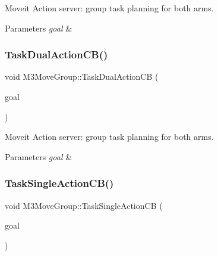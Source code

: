 Moveit Action server\+: group task planning for both arms. 


\begin{DoxyParams}{Parameters}
{\em goal} & \\
\hline
\end{DoxyParams}
\mbox{\label{classM3MoveGroup_a4999726d3def40e06217e81fb7f095ab}} 
\subsubsection{\texorpdfstring{Task\+Dual\+Action\+C\+B()}{TaskDualActionCB()}\hspace{0.1cm}{\footnotesize\ttfamily [2/2]}}
{\footnotesize\ttfamily void M3\+Move\+Group\+::\+Task\+Dual\+Action\+CB (\begin{DoxyParamCaption}\item[{const m3\+\_\+moveit\+::\+Moveit\+Dual\+Goal\+Const\+Ptr \&}]{goal }\end{DoxyParamCaption})\hspace{0.3cm}{\ttfamily [inline]}}



Moveit Action server\+: group task planning for both arms. 


\begin{DoxyParams}{Parameters}
{\em goal} & \\
\hline
\end{DoxyParams}
\mbox{\label{classM3MoveGroup_a5cbdff90f02f8067d55c1b4592b24b72}} 
\subsubsection{\texorpdfstring{Task\+Single\+Action\+C\+B()}{TaskSingleActionCB()}\hspace{0.1cm}{\footnotesize\ttfamily [1/2]}}
{\footnotesize\ttfamily void M3\+Move\+Group\+::\+Task\+Single\+Action\+CB (\begin{DoxyParamCaption}\item[{const m3\+\_\+moveit\+::\+Moveit\+Single\+Goal\+Const\+Ptr \&}]{goal }\end{DoxyParamCaption})\hspace{0.3cm}{\ttfamily [inline]}}



